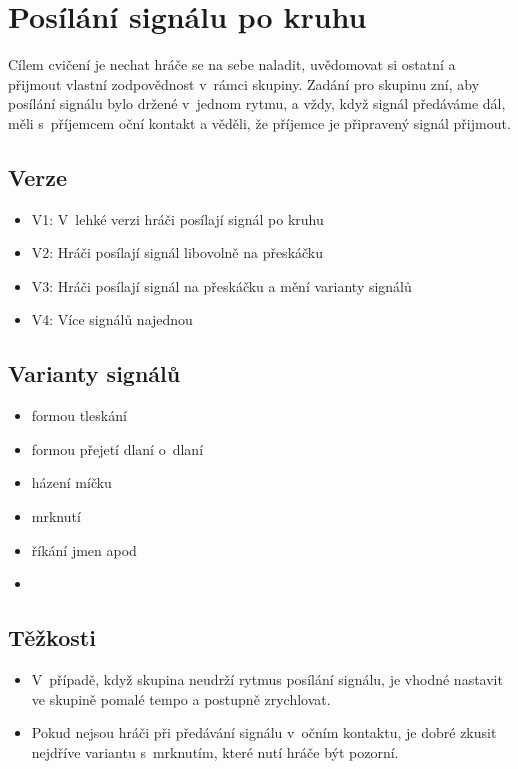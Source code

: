  
 
 
 
\needspace{5cm} \section{Posílání signálu po kruhu} \label{posílání signálu po kruhu} Cílem cvičení je nechat hráče se na sebe naladit, uvědomovat si ostatní a přijmout vlastní zodpovědnost v~rámci skupiny. Zadání pro skupinu zní, aby posílání signálu bylo držené v~jednom rytmu, a vždy, když signál předáváme dál, měli s~příjemcem oční kontakt a věděli, že příjemce je připravený signál přijmout. 
 
\subsection{  Verze } \begin{itemize}
\item  V1: V~lehké verzi hráči posílají signál po kruhu
\item  V2: Hráči posílají signál libovolně na přeskáčku
\item  V3: Hráči posílají signál na přeskáčku a mění varianty signálů
\item  V4: Více signálů najednou
\end{itemize}
 
\subsection{ Varianty signálů } \begin{itemize}
\item  formou tleskání
\item  formou přejetí dlaní o~dlaní
\item  házení míčku
\item  mrknutí
\item  říkání jmen apod
\item  {}
\end{itemize}
 
\subsection{ Těžkosti } \begin{itemize}
\item  V~případě, když skupina neudrží rytmus posílání signálu, je vhodné nastavit ve skupině pomalé tempo a postupně zrychlovat.
\item  Pokud nejsou hráči při předávání signálu v~očním kontaktu, je dobré zkusit nejdříve variantu s~mrknutím, které nutí hráče být pozorní.
\end{itemize}
 
